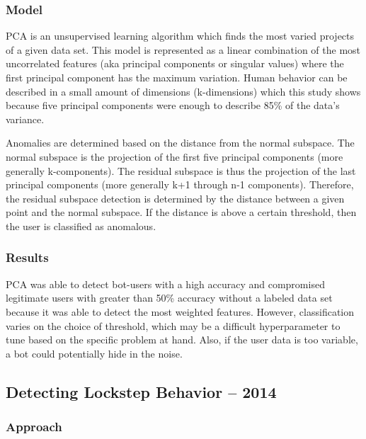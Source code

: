 \documentclass[11pt, oneside]{article}   	%
\begin{document}
\subsubsection*{Model}

\quad PCA is an unsupervised learning algorithm which finds the most varied projects of a given data set.
This model is represented as a linear combination of the most uncorrelated features (aka principal components or singular values) where the first principal component has the maximum variation.
Human behavior can be described in a small amount of dimensions (k-dimensions) which this study shows because five principal components were enough to describe 85\% of the data's variance.

\quad Anomalies are determined based on the distance from the normal subspace.
The normal subspace is the projection of the first five principal components (more generally k-components).
The residual subspace is thus the projection of the last principal components (more generally k+1 through n-1 components).
Therefore, the residual subspace detection is determined by the distance between a given point and the normal subspace.
If the distance is above a certain threshold, then the user is classified as anomalous.

\subsubsection*{Results}

\quad PCA was able to detect bot-users with a high accuracy and compromised legitimate users with greater than 50\% accuracy without a labeled data set because it was able to detect the most weighted features.
However, classification varies on the choice of threshold, which may be a difficult hyperparameter to tune based on the specific problem at hand.
Also, if the user data is too variable, a bot could potentially hide in the noise.

\subsection*{Detecting Lockstep Behavior -- 2014}

\subsubsection*{Approach}
\end{document}
